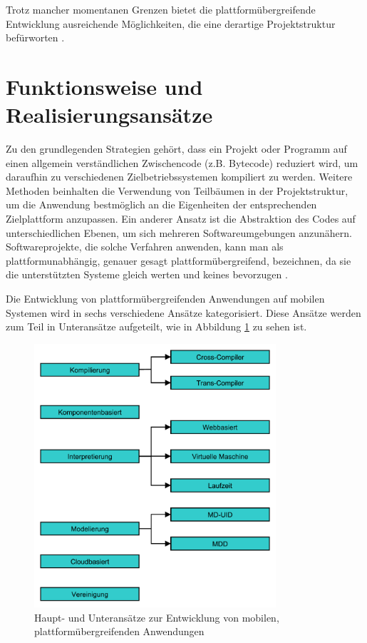 Trotz mancher momentanen Grenzen bietet die plattformübergreifende Entwicklung ausreichende Möglichkeiten, die eine derartige Projektstruktur befürworten \citep{cross_plattform_explanation}.

\section{Funktionsweise und Realisierungsansätze}
Zu den grundlegenden Strategien gehört, dass ein Projekt oder Programm auf einen allgemein verständlichen Zwischencode (z.B. Bytecode) reduziert wird, um daraufhin zu verschiedenen Zielbetriebssystemen kompiliert zu werden. Weitere Methoden beinhalten die Verwendung von Teilbäumen in der Projektstruktur, um die Anwendung bestmöglich an die Eigenheiten der entsprechenden Zielplattform anzupassen. Ein anderer Ansatz ist die Abstraktion des Codes auf unterschiedlichen Ebenen, um sich mehreren Softwareumgebungen anzunähern. Softwareprojekte, die solche Verfahren anwenden, kann man als plattformunabhängig, genauer gesagt plattformübergreifend, bezeichnen, da sie die unterstützten Systeme gleich werten und keines bevorzugen \citep{cross_plattform_explanation}.

\bigskip
Die Entwicklung von plattformübergreifenden Anwendungen auf mobilen Systemen wird in sechs verschiedene Ansätze kategorisiert. Diese Ansätze werden zum Teil in Unteransätze aufgeteilt, wie in Abbildung \ref{graph_cross_plattform_approaches} zu sehen ist.

\begin{figure}[htbp]
	\centering
	\includegraphics[width=0.8\textwidth]{Bilder/Cross_Plattform_Ansaetze}
	\caption{Haupt- und Unteransätze zur Entwicklung von mobilen, plattformübergreifenden Anwendungen}\label{graph_cross_plattform_approaches}
\end{figure}


